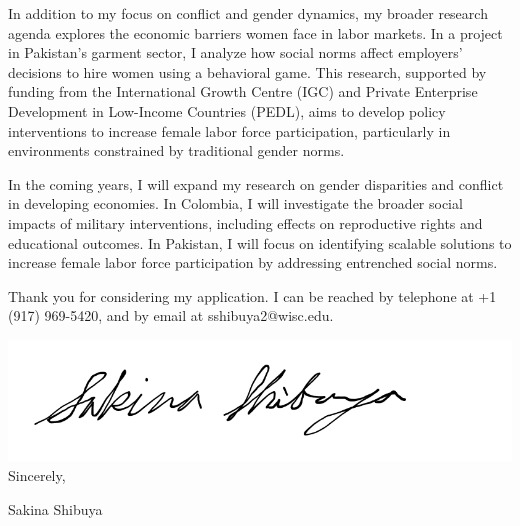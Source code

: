\documentclass[12pt]{letter}
\begin{document}
In addition to my focus on conflict and gender dynamics, my broader research agenda explores the economic barriers women face in labor markets. 
In a project in Pakistan's garment sector, I analyze how social norms affect employers' decisions 
to hire women using a behavioral game. This research, supported by funding from the International Growth Centre (IGC) and Private Enterprise Development in Low-Income Countries (PEDL), 
aims to develop policy interventions to increase female labor force participation, particularly in environments constrained by traditional gender norms.

In the coming years, I will expand my research on gender disparities and conflict in developing economies. 
In Colombia, I will investigate the broader social impacts of military interventions, including effects on reproductive rights and educational outcomes. 
In Pakistan, I will focus on identifying scalable solutions to increase female labor force participation by addressing entrenched social norms. 


Thank you for considering my application. 
I can be reached by telephone at +1 (917) 969-5420, and by email at sshibuya2@wisc.edu.

\bigskip

\includegraphics[height=4\baselineskip]{signature.png}  \\

\vspace*{-6.5\baselineskip}Sincerely, 

\vspace{2.5\baselineskip}Sakina Shibuya
\end{document}

